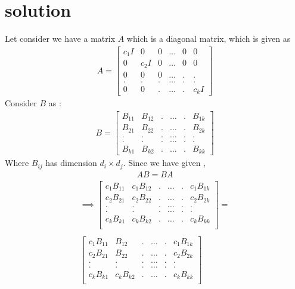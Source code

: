 \documentclass[journal,12pt,twocolumn]{IEEEtran}
\begin{document}
\section{solution}
Let consider we have a matrix $A$ which is a diagonal matrix, which is  given as 
\begin{align}  
	 A =  \begin{bmatrix}
	c_{1}I & 0        & 0  & \dots & 0     & 0 \\ 
	0      &  c_{2}I  & 0  & \dots & 0     & 0 \\ 
	0      &  0       & 0  & \dots & .     & . \\
	.      &  .       & .  & \dots & .     & .  \\
	0     &  0        & .  & \dots & .     & c_{k}I 
\end{bmatrix}
\end{align}
 Consider $B$ as :
 \begin{align}  
 B =  \begin{bmatrix}
 B_{11}    & B_{12}   & . & \dots   & . & B_{1k}  \\ 
 B_{21}    & B_{22}   & . & \dots   & . & B_{2k} \\ 
 .         &  .       & . & \dots   & . & . \\
 .         &  .       & . & \dots   & . & .  \\
 B_{k1}    & B_{k2}   & . & \dots   & . & B_{kk} 
 \end{bmatrix}
 \end{align} 
Where $B_{ij}$ has dimension $d_{i} \times d_{j}$. Since  we have given ,
\begin{align}
AB = BA
\end{align}
\begin{multline}
\implies   \begin{bmatrix}
c_1B_{11}    & c_1B_{12}   & . & \dots   & . & c_1B_{1k}  \\ 
c_2B_{21}    &c_2 B_{22}   & . & \dots   & . & c_2B_{2k} \\ 
.         &  .       & . & \dots   & . & . \\
.         &  .       & . & \dots   & . & .  \\
c_kB_{k1}    & c_kB_{k2}   & . & \dots   & . & c_kB_{kk} \\
\end{bmatrix} =  \\ \\ \begin{bmatrix}
c_1B_{11}    & B_{12}   & . & \dots   & . & c_1B_{1k}  \\ 
c_2B_{21}    & B_{22}   & . & \dots   & . &c_2 B_{2k} \\ 
.         &  .       & . & \dots   & . & . \\
.         &  .       & . & \dots   & . & .  \\
c_kB_{k1}    & c_kB_{k2}   & . & \dots   & . & c_kB_{kk} \\
\end{bmatrix} \label{2.4}
\end{multline}
\end{document}
